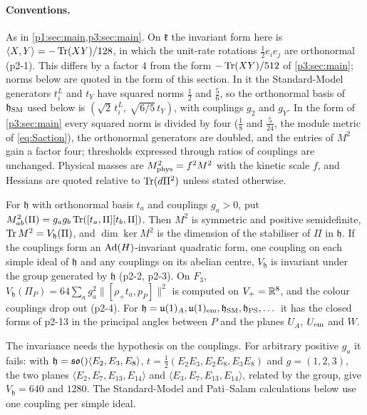 \paragraph{Conventions.} As in \cref{p1:sec:main,p3:sec:main}. On $\mathfrak k$ the invariant form here is $\langle X,Y\rangle=-\operatorname{Tr}(XY)/128$, in which the unit-rate
rotations $\tfrac12e_ie_j$ are orthonormal (p2-1). This differs by a factor $4$ from the form $-\operatorname{Tr}(XY)/512$ of \cref{p3:sec:main}; norms below are quoted in the
form of this section. In it the Standard-Model generators $t^L_i$ and $t_Y$ have squared norms $\tfrac12$ and $\tfrac56$, so the orthonormal basis of
$\mathfrak h_{\rm SM}$ used below is $(\sqrt2\,t^L_i,\ \sqrt{6/5}\,t_Y)$, with couplings $g_2$ and $g_Y$. In the form of \cref{p3:sec:main} every squared norm is divided
by four ($\tfrac18$ and $\tfrac5{24}$, the module metric of \eqref{eq:Saction}), the orthonormal generators are doubled, and the entries of $M^2$ gain a factor four;
thresholds expressed through ratios of couplings are unchanged. Physical masses are $M^2_{\rm phys}=f^2M^2$ with the kinetic scale $f$, and Hessians are quoted relative
to $\operatorname{Tr}(d\Pi^2)$ unless stated otherwise.

\begin{proposition}
\label{p2:prop:mass}
For $\mathfrak h$ with orthonormal basis $t_a$ and couplings $g_a>0$, put $M^2_{ab}(\Pi)=g_ag_b\operatorname{Tr}([t_a,\Pi][t_b,\Pi])$. Then $M^2$ is symmetric and positive
semidefinite, $\operatorname{Tr} M^2=V_{\mathfrak h}(\Pi)$, and $\dim\ker M^2$ is the dimension of the stabiliser of $\Pi$ in $\mathfrak h$. If the couplings form an $\operatorname{Ad}(H)$-invariant
quadratic form, one coupling on each simple ideal of $\mathfrak h$ and any couplings on its abelian centre, $V_{\mathfrak h}$ is invariant under the group generated by
$\mathfrak h$ (p2-2, p2-3). On $F_3$, $V_{\mathfrak h}(\Pi_P)=64\sum_ag_a^2\|[\rho_+t_a,p_P]\|^2$ is computed on $V_+=\mathbb{R}^8$, and the colour couplings drop
out (p2-4). For $\mathfrak h=\mathfrak{u}(1)_A,\mathfrak{u}(1)_{\rm em},\mathfrak h_{\rm SM},\mathfrak h_{\rm PS},\dots$ it has the closed forms of p2-13 in the principal angles between $P$ and the
planes $U_A$, $U_{\rm em}$ and $W$.
\end{proposition}

The invariance needs the hypothesis on the couplings. For arbitrary positive $g_a$ it fails: with $\mathfrak h=\mathfrak{so}()\langle E_2,E_3,E_8\rangle$,
$t=\tfrac12(E_2E_3,E_2E_8,E_3E_8)$ and $g=(1,2,3)$, the two planes $\langle E_2,E_7,E_{13},E_{14}\rangle$ and $\langle E_3,E_7,E_{13},E_{14}\rangle$, related by the group,
give $V_{\mathfrak h}=640$ and $1280$. The Standard-Model and Pati--Salam calculations below use one coupling per simple ideal.

